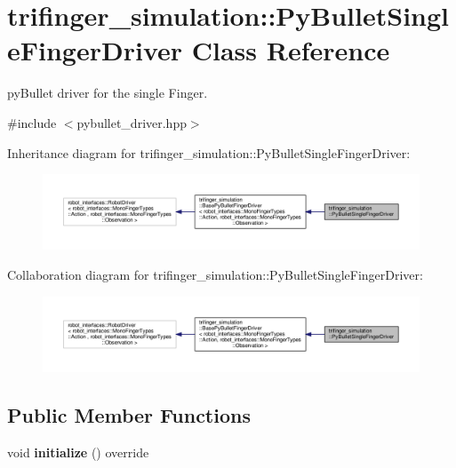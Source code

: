 \hypertarget{classtrifinger__simulation_1_1PyBulletSingleFingerDriver}{}\section{trifinger\+\_\+simulation\+:\+:Py\+Bullet\+Single\+Finger\+Driver Class Reference}
\label{classtrifinger__simulation_1_1PyBulletSingleFingerDriver}


py\+Bullet driver for the single Finger.  




{\ttfamily \#include $<$pybullet\+\_\+driver.\+hpp$>$}



Inheritance diagram for trifinger\+\_\+simulation\+:\+:Py\+Bullet\+Single\+Finger\+Driver\+:
\nopagebreak
\begin{figure}[H]
\begin{center}
\leavevmode
\includegraphics[width=350pt]{classtrifinger__simulation_1_1PyBulletSingleFingerDriver__inherit__graph}
\end{center}
\end{figure}


Collaboration diagram for trifinger\+\_\+simulation\+:\+:Py\+Bullet\+Single\+Finger\+Driver\+:
\nopagebreak
\begin{figure}[H]
\begin{center}
\leavevmode
\includegraphics[width=350pt]{classtrifinger__simulation_1_1PyBulletSingleFingerDriver__coll__graph}
\end{center}
\end{figure}
\subsection*{Public Member Functions}
\begin{DoxyCompactItemize}
\item 
\mbox{\label{classtrifinger__simulation_1_1PyBulletSingleFingerDriver_a5ed94f4f994ebdc286e6472095d3b623}} 
void {\bfseries initialize} () override
\end{DoxyCompactItemize}
